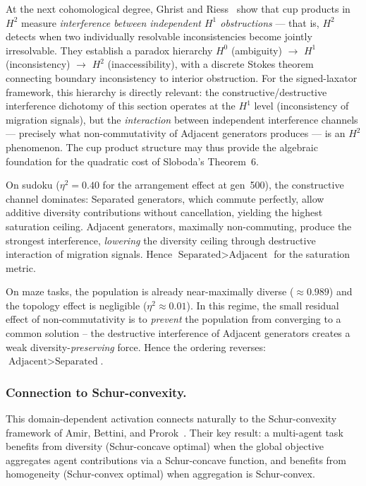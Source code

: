 \begin{enumerate}
  At the next cohomological degree, Ghrist and
  Riess~\cite{ghrist2026cup} show that cup products in~$H^2$ measure
  \emph{interference between independent $H^1$ obstructions} --- that
  is, $H^2$ detects when two individually resolvable inconsistencies
  become jointly irresolvable.  They establish a paradox hierarchy
  $H^0$ (ambiguity) $\to$ $H^1$ (inconsistency) $\to$ $H^2$
  (inaccessibility), with a discrete Stokes theorem connecting
  boundary inconsistency to interior obstruction.  For the
  signed-laxator framework, this hierarchy is directly relevant:
  the constructive/destructive interference dichotomy of this section
  operates at the $H^1$ level (inconsistency of migration signals),
  but the \emph{interaction} between independent interference channels
  --- precisely what non-commutativity of Adjacent generators
  produces --- is an $H^2$ phenomenon.  The cup product structure
  may thus provide the algebraic foundation for the quadratic cost
  of Sloboda's Theorem~6.
\end{enumerate}

\noindent
On sudoku ($\eta^2 = 0.40$ for the arrangement effect at gen~500),
the constructive channel dominates: Separated generators, which
commute perfectly, allow additive diversity contributions without
cancellation, yielding the highest saturation ceiling.  Adjacent
generators, maximally non-commuting, produce the strongest
interference, \emph{lowering} the diversity ceiling through
destructive interaction of migration signals.  Hence
$\text{Separated} > \text{Adjacent}$ for the saturation metric.

On maze tasks, the population is already near-maximally diverse
($\approx 0.989$) and the topology effect is negligible
($\eta^2 \approx 0.01$).  In this regime, the small residual effect
of non-commutativity is to \emph{prevent} the population from
converging to a common solution -- the destructive interference of
Adjacent generators creates a weak diversity-\emph{preserving} force.
Hence the ordering reverses: $\text{Adjacent} > \text{Separated}$.

\subsubsection{Connection to Schur-convexity.}

This domain-dependent activation connects naturally to the
Schur-convexity framework of Amir, Bettini, and
Prorok~\cite{amir2026schur}.  Their key result: a multi-agent task
benefits from diversity (Schur-concave optimal) when the global
objective aggregates agent contributions via a Schur-concave function,
and benefits from homogeneity (Schur-convex optimal) when aggregation
is Schur-convex.

